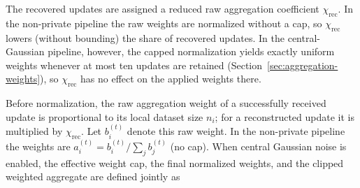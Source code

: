 
The recovered updates are assigned a reduced raw aggregation coefficient \(\chi_{\mathrm{rec}}\). In the non-private pipeline the raw weights are normalized without a cap, so \(\chi_{\mathrm{rec}}\) lowers (without bounding) the share of recovered updates. In the central-Gaussian pipeline, however, the capped normalization yields exactly uniform weights whenever at most ten updates are retained (Section~\ref{sec:aggregation-weights}), so \(\chi_{\mathrm{rec}}\) has no effect on the applied weights there.

\label{sec:aggregation-weights}
Before normalization, the raw aggregation weight of a successfully received update is proportional to its local dataset size \(n_i\); for a reconstructed update it is multiplied by \(\chi_{\mathrm{rec}}\). Let \(b_i^{(t)}\) denote this raw weight. In the non-private pipeline the weights are \(a_i^{(t)}=b_i^{(t)}/\sum_{j}b_j^{(t)}\) (no cap). When central Gaussian noise is enabled, the effective weight cap, the final normalized weights, and the clipped weighted aggregate are defined jointly as

